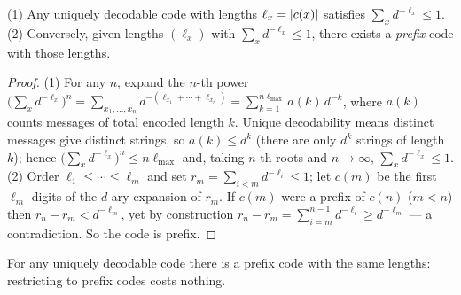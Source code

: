\documentclass[11pt]{article}
\begin{document}
\begin{theorem}\label{thm:kraft}
(1) Any uniquely decodable code with lengths $\ell_x=\lvert c(x)\rvert$ satisfies
$\sum_{x}d^{-\ell_x}\le1$. (2) Conversely, given lengths $(\ell_x)$ with $\sum_x d^{-\ell_x}\le1$,
there exists a \emph{prefix} code with those lengths.
\end{theorem}
\begin{proof}
(1) For any $n$, expand the $n$-th power
$\big(\sum_x d^{-\ell_x}\big)^n=\sum_{x_1,\dots,x_n}d^{-(\ell_{x_1}+\cdots+\ell_{x_n})}
=\sum_{k=1}^{n\ell_{\max}}a(k)\,d^{-k}$, where $a(k)$ counts messages of total encoded length $k$.
Unique decodability means distinct messages give distinct strings, so $a(k)\le d^{k}$ (there are
only $d^k$ strings of length $k$); hence $\big(\sum_x d^{-\ell_x}\big)^n\le n\ell_{\max}$ and, taking
$n$-th roots and $n\to\infty$, $\sum_x d^{-\ell_x}\le1$. (2) Order $\ell_1\le\cdots\le\ell_{m}$ and
set $r_m=\sum_{i<m}d^{-\ell_i}\le1$; let $c(m)$ be the first $\ell_m$ digits of the $d$-ary
expansion of $r_m$. If $c(m)$ were a prefix of $c(n)$ ($m<n$) then $r_n-r_m<d^{-\ell_m}$, yet by
construction $r_n-r_m=\sum_{i=m}^{n-1}d^{-\ell_i}\ge d^{-\ell_m}$ --- a contradiction. So the code is
prefix.
\end{proof}
\begin{corollary}
For any uniquely decodable code there is a prefix code with the same lengths: restricting to prefix
codes costs nothing.
\end{corollary}

\end{document}
